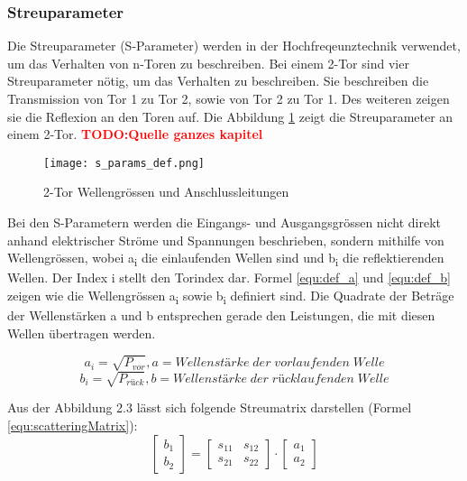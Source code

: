 \subsubsection{Streuparameter}\label{subsubsec:streuparameter}

Die Streuparameter (S-Parameter) werden in der Hochfreqeunztechnik verwendet, um das Verhalten von n-Toren zu beschreiben. Bei einem 2-Tor sind vier Streuparameter nötig, um das Verhalten zu beschreiben. Sie beschreiben die Transmission von Tor 1 zu Tor 2, sowie von Tor 2 zu Tor 1. Des weiteren zeigen sie die Reflexion an den Toren auf. Die Abbildung \ref{fig:2-Tor} zeigt die Streuparameter an einem 2-Tor. \textcolor{red}{\textbf{TODO:Quelle ganzes kapitel}}


\begin{figure}[H]
	\centering
	\texttt{[image: s\_params\_def.png]}
	\caption{2-Tor Wellengrössen und Anschlussleitungen \cite{hftech}}
	\label{fig:2-Tor}
\end{figure}

Bei den S-Parametern werden die Eingangs- und Ausgangsgrössen nicht direkt anhand elektrischer Ströme und Spannungen beschrieben, sondern mithilfe von Wellengrössen, wobei a\textsubscript{i} die einlaufenden Wellen sind und b\textsubscript{i} die reflektierenden Wellen. Der Index i stellt den Torindex dar. Formel \ref{equ:def_a} und \ref{equ:def_b} zeigen wie die Wellengrössen a\textsubscript{i} sowie b\textsubscript{i} definiert sind. Die Quadrate der Beträge der Wellenstärken a und b entsprechen gerade den Leistungen, die mit diesen Wellen übertragen werden.\cite{hftech}\cite{Bernstein2015}

\begin{equation}\label{equ:def_a}
	a_{ i } = \sqrt{ P_{ vor } }, a = Wellenstärke\;der\;vorlaufenden\;Welle
\end{equation}
\begin{equation}\label{equ:def_b}
	b_{ i } = \sqrt{ P_{ rück } }, b = Wellenstärke\;der\;rücklaufenden\;Welle
\end{equation}

Aus der Abbildung 2.3 lässt sich folgende Streumatrix darstellen (Formel \ref{equ:scatteringMatrix}):
\begin{equation}\label{equ:scatteringMatrix}
	\left[
		\begin{matrix}b_1 \\ b_2 \end{matrix}
	\right]
 	=
 	\left[
 		\begin{matrix}
			s_{11}&s_{12} \\s_{21}&s_{22}
		\end{matrix}
	\right]
	\cdot 
	\left[
		\begin{matrix}
			a_1\\a_2
		\end{matrix}
	\right]
\end{equation}

